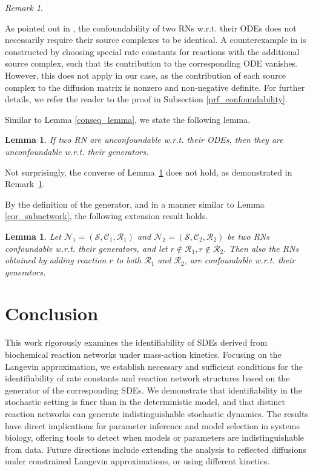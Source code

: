\documentclass[10pt,a4paper]{amsart}
\newtheorem{lemma}[theorem]{Lemma}
\theoremstyle{definition}
\theoremstyle{remark}
\newtheorem{remark}[theorem]{Remark}
\theoremstyle{consequence}
\def\cN{\mathcal{N}}
\def\cR{\mathcal{R}}
\def\cS{\mathcal{S}}
\def\cC{\mathcal{C}}
\numberwithin{equation}{section}
\begin{document}
\begin{remark}\label{remark_identical_source_complex}

    As pointed out in \cite{szederkenyi2009comment}, the confoundability of two RNs w.r.t. their ODEs does not necessarily require their source complexes to be identical. A counterexample in \cite{szederkenyi2009comment} is constructed by choosing special rate constants for reactions with the additional source complex, such that its contribution to the corresponding ODE vanishes. However, this does not apply in our case, as the contribution of each source complex to the diffusion matrix is nonzero and non-negative definite. For further details, we refer the reader to the proof in Subsection  \ref{prf_confoundability}.

\end{remark}

Similar to Lemma \ref{conseq_lemma}, we state the following lemma.
\begin{lemma}\label{l.unconfoundability}
If two RN are unconfoundable w.r.t. their ODEs, then they are unconfoundable w.r.t. their generators.
\end{lemma}
Not surprisingly, the converse of Lemma~\ref{l.unconfoundability} does not hold, as demonstrated in Remark~\ref{remark_identical_source_complex}. 


By the definition of the generator, and in a manner similar to Lemma \ref{cor_subnetwork}, the following extension result holds.
\begin{lemma}\label{confoundability_added_reactions}{    Let $\cN_1 = (\cS, \cC_1, \cR_1)$ and $\cN_2 = (\cS, \cC_2, \cR_2)$}
 be two RNs confoundable w.r.t. their generators, and let $r\not\in\mathcal{R}_1,r\not\in\mathcal{R}_2$.  Then also the RNs obtained by adding reaction $r$ to both $\mathcal{R}_1$ and $\mathcal{R}_2$, are confoundable w.r.t. their generators.
\end{lemma}

\section{Conclusion}
This work rigorously examines the identifiability of SDEs derived from biochemical reaction networks under mass-action kinetics. Focusing on the Langevin approximation, we establish necessary and sufficient conditions for the identifiability of rate constants and reaction network structures based on the generator of the corresponding SDEs. We demonstrate that identifiability in the stochastic setting is finer than in the deterministic model, and that distinct reaction networks can generate indistinguishable stochastic dynamics. The results have direct implications for parameter inference and model selection in systems biology, offering tools to detect when models or parameters are indistinguishable from data. Future directions include extending the analysis to reflected diffusions under constrained Langevin approximations, or using different kinetics.
\end{document}
